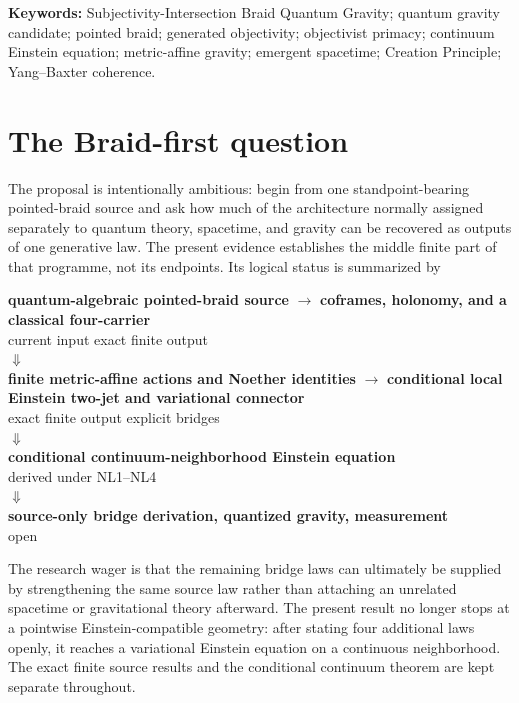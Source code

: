 \documentclass[11pt]{article}
\theoremstyle{definition}
\theoremstyle{remark}
\begin{document}
\noindent\textbf{Keywords:} Subjectivity-Intersection Braid Quantum Gravity; quantum gravity candidate; pointed braid; generated objectivity; objectivist primacy; continuum Einstein equation; metric-affine gravity; emergent spacetime; Creation Principle; Yang--Baxter coherence.

\section{The Braid-first question}

The proposal is intentionally ambitious: begin from one standpoint-bearing pointed-braid source and ask how much of the architecture normally assigned separately to quantum theory, spacetime, and gravity can be recovered as outputs of one generative law. The present evidence establishes the middle finite part of that programme, not its endpoints. Its logical status is summarized by
\begin{center}
\begin{minipage}{0.96\linewidth}
\centering
\small
\textbf{quantum-algebraic pointed-braid source}
$\longrightarrow$
\textbf{coframes, holonomy, and a classical four-carrier}\\[-0.15em]
{\footnotesize current input \hspace{16em} exact finite output}\\[0.25em]
$\Downarrow$\\[-0.1em]
\textbf{finite metric-affine actions and Noether identities}
$\longrightarrow$
\textbf{conditional local Einstein two-jet and variational connector}\\[-0.15em]
{\footnotesize exact finite output \hspace{6em} explicit bridges}\\[0.25em]
$\Downarrow$\\[-0.1em]
\textbf{conditional continuum-neighborhood Einstein equation}\\[-0.15em]
{\footnotesize derived under NL1--NL4}\\[0.25em]
$\Downarrow$\\[-0.1em]
\textbf{source-only bridge derivation, quantized gravity, measurement}\\[-0.15em]
{\footnotesize open}
\end{minipage}
\end{center}
The research wager is that the remaining bridge laws can ultimately be supplied by strengthening the same source law rather than attaching an unrelated spacetime or gravitational theory afterward. The present result no longer stops at a pointwise Einstein-compatible geometry: after stating four additional laws openly, it reaches a variational Einstein equation on a continuous neighborhood. The exact finite source results and the conditional continuum theorem are kept separate throughout.
\end{document}
